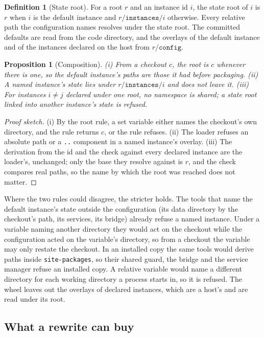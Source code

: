 \documentclass[11pt]{article}
\theoremstyle{plain}
\newtheorem{proposition}[theorem]{Proposition}
\theoremstyle{definition}
\newtheorem{definition}[theorem]{Definition}
\theoremstyle{remark}
\begin{document}
\begin{definition}[State root]
For a root $r$ and an instance id $i$, the state root of $i$ is $r$ when $i$ is the default
instance and $r/\texttt{instances}/i$ otherwise. Every relative path the configuration names
resolves under the state root. The committed defaults are read from the code directory, and the
overlays of the default instance and of the instances declared on the host from $r/\texttt{config}$.
\end{definition}

\begin{proposition}[Composition]\label{prop:compose}
(i) From a checkout $c$, the root is $c$ whenever there is one, so the default instance's paths are
those it had before packaging. (ii) A named instance's state lies under $r/\texttt{instances}/i$ and
does not leave it. (iii) For instances $i \neq j$ declared under one root, no namespace is shared;
a state root linked into another instance's state is refused.
\end{proposition}
\begin{proof}[Proof sketch]
(i) By the root rule, a set variable either names the checkout's own directory, and the rule returns
$c$, or the rule refuses. (ii) The loader refuses an absolute path or a \texttt{..} component in a
named instance's overlay. (iii) The derivation from the id and the check against every declared
instance are the loader's, unchanged; only the base they resolve against is $r$, and the check
compares real paths, so the name by which the root was reached does not matter.
\end{proof}

Where the two rules could disagree, the stricter holds. The tools that name the default instance's
state outside the configuration (its data directory by the checkout's path, its services, its
bridge) already refuse a named instance. Under a variable naming another directory they would act
on the checkout while the configuration acted on the variable's directory, so from a checkout the
variable may only restate the checkout. In an installed copy the same tools would derive paths
inside \texttt{site-packages}, so their shared guard, the bridge and the service manager refuse an
installed copy. A relative variable would name a different directory for each working directory a
process starts in, so it is refused. The wheel leaves out the overlays of declared instances, which
are a host's and are read under its root.

\subsection{What a rewrite can buy}
\end{document}

